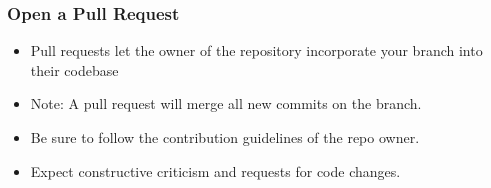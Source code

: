 \documentclass[unknownkeysallowed]{beamer}
\begin{document}
\begin{frame}
    \frametitle{Open a Pull Request}
    \begin{itemize}
        \item{Pull requests let the owner of the repository incorporate your branch into their codebase}
        \item{Note: A pull request will merge all new commits on the branch.}
        \item{Be sure to follow the contribution guidelines of the repo owner.}
        \item{Expect constructive criticism and requests for code changes.}
    \end{itemize}
    \vspace{1cm} %
\end{frame}
\end{document}
